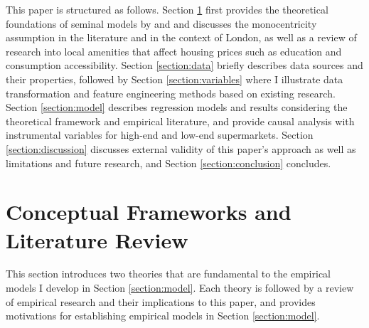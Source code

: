 \documentclass{article}
\begin{document}
This paper is structured as follows. Section \ref{section:lit} first provides the theoretical foundations of seminal models by \citet{AlonsoWilliam1964Lalu} and \citet{Rosen1984} and discusses the monocentricity assumption in the literature and in the context of London, as well as a review of research into local amenities that affect housing prices such as education and consumption accessibility. Section \ref{section:data} briefly describes data sources and their properties, followed by Section \ref{section:variables} where I illustrate data transformation and feature engineering methods based on existing research. Section \ref{section:model} describes regression models and results considering the theoretical framework and empirical literature, and provide causal analysis with instrumental variables for high-end and low-end supermarkets. Section \ref{section:discussion} discusses external validity of this paper's approach as well as limitations and future research, and Section \ref{section:conclusion} concludes.

\section{Conceptual Frameworks and Literature Review} \label{section:lit}
This section introduces two theories that are fundamental to the empirical models I develop in Section \ref{section:model}. Each theory is followed by a review of empirical research and their implications to this paper, and provides motivations for establishing empirical models in Section \ref{section:model}.
\end{document}

